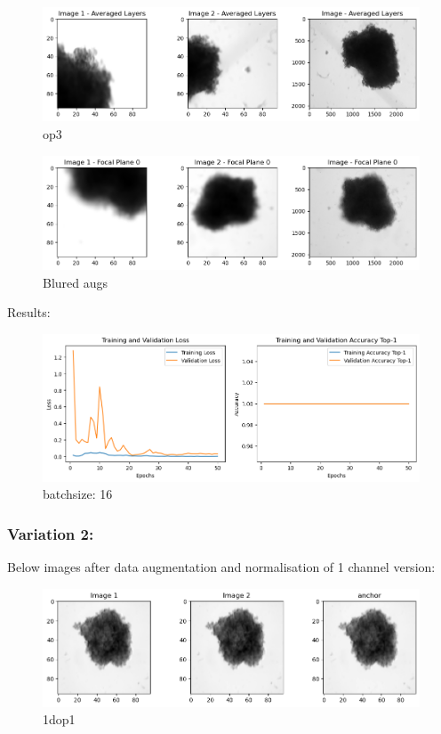\documentclass[12pt,twoside,a4paper,parskip]{scrbook} %
\begin{document}
  \begin{figure}[H]
    \centering
    \includegraphics[width=0.9\linewidth]{figures/output3.png} %
    \caption{op3}
    \label{fig:output3}
  \end{figure}

  \begin{figure}[H]
    \centering
    \includegraphics[width=0.9\linewidth]{figures/op4.png} %
    \caption{Blured augs}
    \label{fig:output4}
  \end{figure}

Results:
\begin{figure}[H]
  \centering
  \includegraphics[width=0.9\linewidth]{figures/image.png} %
  \caption{batchsize: 16}
  \label{fig:batch 16}
\end{figure}
\subsubsection{Variation 2:}
Below images after data augmentation and normalisation of 1 channel version:
\begin{figure}[H]
  \centering
  \includegraphics[width=0.9\linewidth]{figures/1dop1.png} %
  \caption{1dop1}
  \label{fig:1doutput1}
\end{figure}
\end{document}
